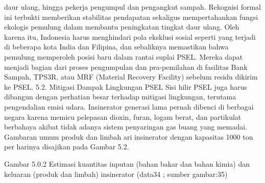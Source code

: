 \documentclass[
  letterpaper,
  DIV=11,
  numbers=noendperiod]{scrreprt}
\begin{document}
daur ulang, hingga pekerja pengumpul dan pengangkut sampah. Rekognisi
formal ini terbukti memberikan stabilitas pendapatan sekaligus
mempertahankan fungsi ekologis pemulung dalam membantu peningkatan
tingkat daur ulang. Oleh karena itu, Indonesia harus menghindari pola
eksklusi sosial seperti yang terjadi di beberapa kota India dan
Filipina, dan sebaliknya memastikan bahwa pemulung memperoleh posisi
baru dalam rantai suplai PSEL. Mereka dapat menjadi bagian dari proses
pengumpulan dan pra-pemilahan di fasilitas Bank Sampah, TPS3R, atau MRF
(Material Recovery Facility) sebelum residu dikirim ke PSEL. 5.2.
Mitigasi Dampak Lingkungan PSEL Sisi hilir PSEL juga harus dibangun
dengan perhatian besar terhadap mitigasi lingkungan, terutama
pengendalian emisi udara. Insinerator generasi lama pernah dibenci di
berbagai negara karena memicu pelepasan dioxin, furan, logam berat, dan
partikulat berbahaya akibat tidak adanya sistem penyaringan gas buang
yang memadai. Gambaran umum produk dan limbah ari insinerator dengan
kapasitas 1000 ton per harinya disajikan pada Gambar 5.2.

Gambar 5.0.2 Estimasi kuantitas inputan (bahan bakar dan bahan kimia)
dan keluaran (produk dan limbah) insinerator (data34 ; sumber gambar:35)
\end{document}
